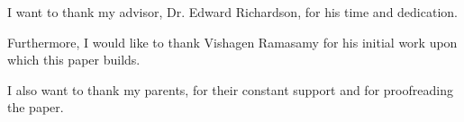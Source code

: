 
I want to thank my advisor, Dr. Edward Richardson, for his time and dedication.
 
 Furthermore, I would like to thank Vishagen Ramasamy for his initial work upon which this paper builds.
 
 I also want to thank my parents, for their constant support and for proofreading the paper. 